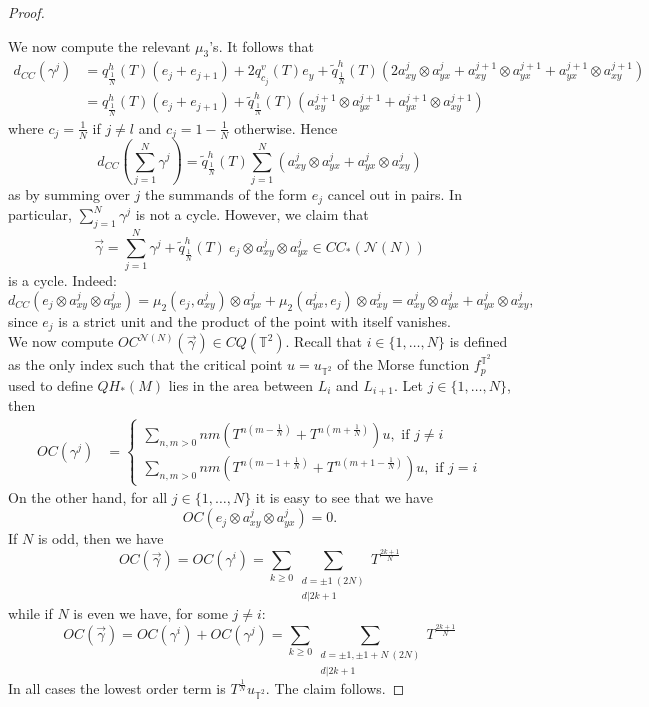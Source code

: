 \begin{proof}
\begin{enumerate}
	\end{enumerate}
	We now compute the relevant $\mu_3$'s.
	It follows that \begin{align*}
		d_{CC}(\gamma^j) & = q^h_{\frac{1}{N}}(T)(e_j+e_{j+1}) + 2q^v_{c_j}(T)e_y + \tilde{q}^h_{\frac{1}{N}}(T)(2a^j_{xy}\otimes a^j_{yx} + a^{j+1}_{xy}\otimes a^{j+1}_{yx} + a^{j+1}_{yx}\otimes a^{j+1}_{xy}) \\ & = q^h_{\frac{1}{N}}(T)(e_j+e_{j+1}) + \tilde{q}^h_{\frac{1}{N}}(T)(a^{j+1}_{xy}\otimes a^{j+1}_{yx} + a^{j+1}_{yx}\otimes a^{j+1}_{xy})
	\end{align*}
	where $c_j = \frac{1}{N}$ if $j\neq l$ and $c_j=1-\frac{1}{N}$ otherwise.
	Hence $$d_{CC}\left(\sum_{j=1}^N \gamma^j\right) =  \tilde{q}^h_{\frac{1}{N}}(T)\sum_{j=1}^N(a^{j}_{xy}\otimes a^{j}_{yx} + a^{j}_{yx}\otimes a^{j}_{xy}) $$ as by summing over $j$ the summands of the form $e_j$ cancel out in pairs. In particular, $\sum_{j=1}^N\gamma^j$ is not a cycle. However, we claim that $$\vec{\gamma} = \sum_{j=1}^N\gamma^j + \tilde{q}^h_{\frac{1}{N}}(T)\ e_j\otimes a^j_{xy}\otimes a^j_{yx}\in CC_*(\mathcal{N}(N))$$ is a cycle. Indeed: $$d_{CC}(e_j\otimes a^j_{xy}\otimes a^j_{yx}) = \mu_2(e_j,a^j_{xy})\otimes a^j_{yx} + \mu_2(a^j_{yx},e_j)\otimes a^j_{xy} =a^{j}_{xy}\otimes a^{j}_{yx} + a^{j}_{yx}\otimes a^{j}_{xy},$$ since $e_j$ is a strict unit and the product of the point with itself vanishes.\\
	
	We now compute $OC^{\mathcal{N}(N)}(\vec{\gamma})\in CQ(\mathbb{T}^2)$. Recall that $i\in \{1,\ldots, N\}$ is defined as the only index such that the critical point $u=u_{\mathbb{T}^2}$ of the Morse function $f^{\mathbb{T}^2}_p$ used to define $QH_*(M)$ lies in the area between $L_i$ and $L_{i+1}$. Let $j\in \{1,\ldots, N\}$, then \begin{align*}
		OC(\gamma^j) &= \begin{cases}
			\sum_{n,m>0}nm(T^{n(m-\frac{1}{N})}+T^{n(m+\frac{1}{N})})u,  \text{ if }j\neq i\\
			\sum_{n,m>0}nm(T^{n(m-1+\frac{1}{N})}+T^{n(m+1-\frac{1}{N})})u,  \text{ if }j=i
		\end{cases}
	\end{align*}
	On the other hand, for all $j\in \{1,\ldots, N\}$ it is easy to see that we have $$OC(e_j\otimes a^j_{xy}\otimes a^j_{yx}) =0.$$ If $N$ is odd, then we have $$OC(\vec{\gamma}) = OC(\gamma^i) = \sum_{k\geq 0}\sum_{\substack{d=\pm 1 \ (2N)\\ d|2k+1}}T^{\frac{2k+1}{N}}$$ while if $N$ is even we have, for some $j\neq i$: $$OC(\vec{\gamma}) = OC(\gamma^i)+OC(\gamma^j) = \sum_{k\geq 0}\sum_{\substack{d=\pm 1, \pm1+N \ (2N)\\ d|2k+1}}T^{\frac{2k+1}{N}}$$
	In all cases the lowest order term is $T^{\frac{1}{N}}u_{\mathbb{T}^2}$. The claim follows.
	
\end{proof}

